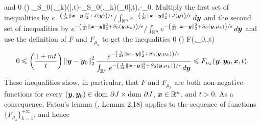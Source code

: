 and
\beq\label{eq:app_convex_ineq2}
0 \leqslant \left(\right) \leqslant \left\langle \varphi_{S_0(\cdot,\mu_k)}(\by|\bx,t)-\varphi_{S_0(\cdot,\mu_k)}(\by_0|\bx,t),\by-\by_{0}\right\rangle.
\eeq
Multiply the first set of inequalities by $e^{-\left(\frac{1}{2t}\left \Vert \boldsymbol{x} - \boldsymbol{y} \right \Vert_{2}^{2} + J(\boldsymbol{y})\right)/\epsilon}/\int_{\mathbb{R}^n}e^{-\left(\frac{1}{2t}\left \Vert \boldsymbol{x} - \boldsymbol{y} \right \Vert_{2}^{2} + J(\boldsymbol{y})\right)/\epsilon} \mathop{}\!d{\boldsymbol{y}}$ and the second set of inequalities by $e^{-\left(\frac{1}{2t}\left \Vert \boldsymbol{x} - \boldsymbol{y} \right \Vert_{2}^{2} + S_0(\boldsymbol{y},\mu_k)\right)/\epsilon}/\int_{\mathbb{R}^n}e^{-\left(\frac{1}{2t}\left \Vert \boldsymbol{x} - \boldsymbol{y} \right \Vert_{2}^{2} + S_0(\boldsymbol{y},\mu_k)\right)/\epsilon} \mathop{}\!d{\boldsymbol{y}}$ and use the definition of $F$ and $F_{\mu_k}$ to get the inequalities
\beq\label{eq:appD_limit0}
0 \leqslant \left(\right) \leqslant F(\by,\by_0,\bx,t)
\eeq
\[
0 \leqslant \left(\frac{1+mt}{t}\right)\left\Vert{\boldsymbol{y}-\boldsymbol{y}_{0}} \right\Vert_{2}^{2} \frac{e^{-\left(\frac{1}{2t}\left \Vert \boldsymbol{x} - \boldsymbol{y} \right \Vert_{2}^{2} + S_0(\boldsymbol{y},\mu_k)\right)/\epsilon}}{\int_{\mathbb{R}^n}e^{-\left(\frac{1}{2t}\left \Vert \boldsymbol{x} - \boldsymbol{y} \right \Vert_{2}^{2} + S_0(\boldsymbol{y},\mu_k)\right)/\epsilon} \mathop{}\!d{\boldsymbol{y}}} \leqslant F_{\mu_k}(\boldsymbol{y},\boldsymbol{y}_0,\boldsymbol{x},t).
\]
These inequalities show, in particular, that $F$ and $F_{\mu_k}$ are both non-negative functions for every $(\boldsymbol{y},\boldsymbol{y}_0) \in \mathrm{dom~}\partial J \times \mathrm{dom~}\partial J$, $\boldsymbol{x} \in \mathbb{R}^n$, and $t>0$. As a consequence, Fatou's lemma (\citep{folland2013real}, Lemma 2.18) applies to the sequence of functions $\{F_{\mu_k}\}_{k=1}^{+\infty}$, and hence
